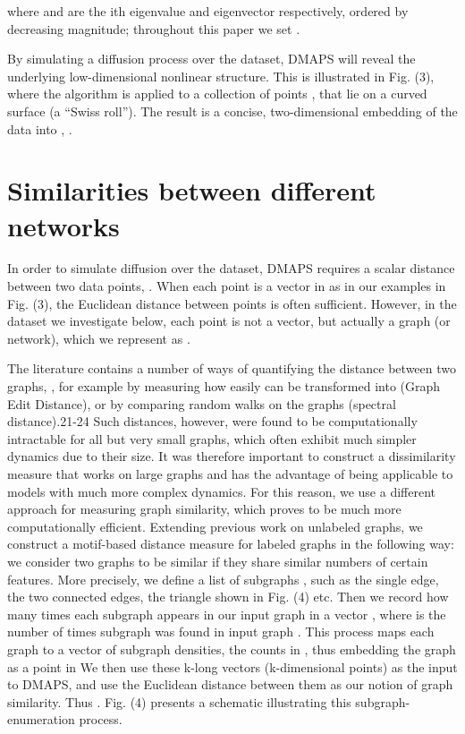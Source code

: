 where and are the ith eigenvalue and eigenvector respectively, ordered
by decreasing magnitude; throughout this paper we set .

By simulating a diffusion process over the dataset, DMAPS will reveal the underlying low-dimensional nonlinear structure. This is illustrated in Fig. (3), where the algorithm is applied to a collection of points ,  that lie on a curved surface (a “Swiss roll”). The result is a concise, two-dimensional embedding of the data into , .

\section{Similarities between different networks}

In order to simulate diffusion over the dataset, DMAPS requires a scalar distance between two data points, . When each point  is a vector in  as in our examples in Fig. (3), the Euclidean distance between points is often sufficient. However, in the dataset we investigate below, each point  is not a vector, but actually a graph (or network), which we represent as .

The literature contains a number of ways of quantifying the distance
between two graphs, , for example by measuring how easily can be
transformed into (Graph Edit Distance), or by comparing random walks
on the graphs (spectral distance).21-24 Such distances, however, were
found to be computationally intractable for all but very small graphs,
which often exhibit much simpler dynamics due to their size. It was
therefore important to construct a dissimilarity measure that works on
large graphs and has the advantage of being applicable to models with
much more complex dynamics. For this reason, we use a different
approach for measuring graph similarity, which proves to be much more
computationally efficient. Extending previous work on unlabeled
graphs, we construct a motif-based distance measure for labeled graphs
in the following way: we consider two graphs to be similar if they
share similar numbers of certain features. More precisely, we define a
list of subgraphs , such as the single edge, the two connected edges,
the triangle shown in Fig. (4) etc. Then we record how many times each
subgraph appears in our input graph in a vector , where is the number
of times subgraph was found in input graph . This process maps each
graph to a vector of subgraph densities, the counts in , thus
embedding the graph as a point in We then use these k-long vectors
(k-dimensional points) as the input to DMAPS, and use the Euclidean
distance between them as our notion of graph similarity. Thus
. Fig. (4) presents a schematic illustrating this subgraph-enumeration
process.


